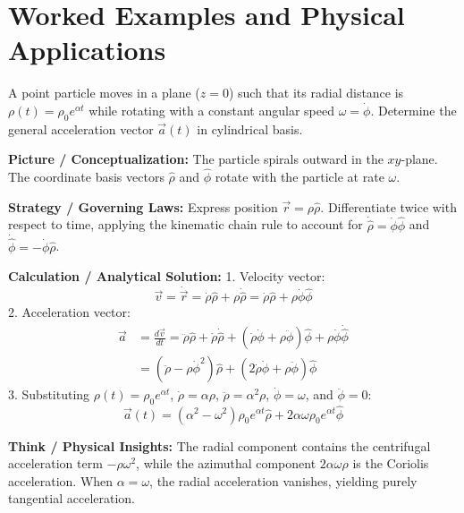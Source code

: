 \section{Worked Examples and Physical Applications}

\begin{psctexample}
A point particle moves in a plane ($z = 0$) such that its radial distance is $\rho(t) = \rho_0 e^{\alpha t}$ while rotating with a constant angular speed $\omega = \dot{\phi}$. Determine the general acceleration vector $\vec{a}(t)$ in cylindrical basis.

\textbf{\color{rbruNavy}Picture / Conceptualization:}
The particle spirals outward in the $xy$-plane. The coordinate basis vectors $\hat{\rho}$ and $\hat{\phi}$ rotate with the particle at rate $\omega$.

\textbf{\color{rbruNavy}Strategy / Governing Laws:}
Express position $\vec{r} = \rho\hat{\rho}$. Differentiate twice with respect to time, applying the kinematic chain rule to account for $\dot{\hat{\rho}} = \dot{\phi}\hat{\phi}$ and $\dot{\hat{\phi}} = -\dot{\phi}\hat{\rho}$.

\textbf{\color{rbruNavy}Calculation / Analytical Solution:}
1. Velocity vector:
\begin{equation}
\vec{v} = \dot{\vec{r}} = \dot{\rho}\hat{\rho} + \rho\dot{\hat{\rho}} = \dot{\rho}\hat{\rho} + \rho\dot{\phi}\hat{\phi}
\end{equation}
2. Acceleration vector:
\begin{align}
\vec{a} &= \frac{d\vec{v}}{dt} = \ddot{\rho}\hat{\rho} + \dot{\rho}\dot{\hat{\rho}} + (\dot{\rho}\dot{\phi} + \rho\ddot{\phi})\hat{\phi} + \rho\dot{\phi}\dot{\hat{\phi}} \nonumber\\
&= (\ddot{\rho} - \rho\dot{\phi}^2)\hat{\rho} + (2\dot{\rho}\dot{\phi} + \rho\ddot{\phi})\hat{\phi}
\end{align}
3. Substituting $\rho(t) = \rho_0 e^{\alpha t}$, $\dot{\rho} = \alpha\rho$, $\ddot{\rho} = \alpha^2\rho$, $\dot{\phi} = \omega$, and $\ddot{\phi} = 0$:
\begin{equation}
\vec{a}(t) = (\alpha^2 - \omega^2)\rho_0 e^{\alpha t}\hat{\rho} + 2\alpha\omega\rho_0 e^{\alpha t}\hat{\phi}
\end{equation}

\textbf{\color{rbruNavy}Think / Physical Insights:}
The radial component contains the centrifugal acceleration term $-\rho\omega^2$, while the azimuthal component $2\alpha\omega\rho$ is the Coriolis acceleration. When $\alpha = \omega$, the radial acceleration vanishes, yielding purely tangential acceleration.
\qedexam
\end{psctexample}


